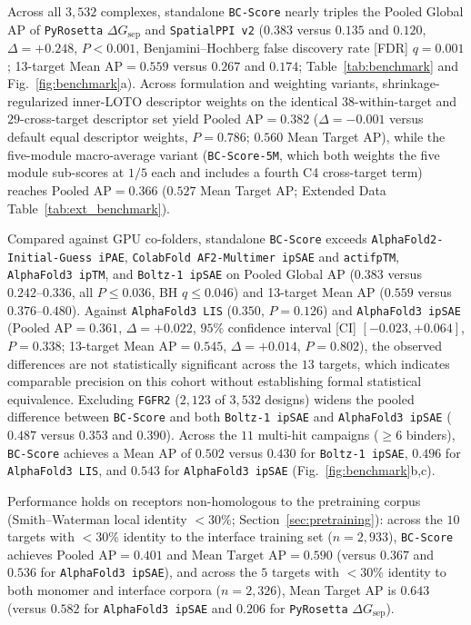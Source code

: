 \documentclass[10pt,twocolumn]{article}
\begin{document}
Across all $3,532$ complexes, standalone \texttt{BC-Score} nearly triples the Pooled Global AP of \texttt{PyRosetta} $\Delta G_{\text{sep}}$ and \texttt{SpatialPPI v2} ($0.383$ versus $0.135$ and $0.120$, $\Delta = +0.248$, $P < 0.001$, Benjamini--Hochberg false discovery rate [FDR] $q = 0.001$; 13-target Mean $\text{AP} = 0.559$ versus $0.267$ and $0.174$; Table~\ref{tab:benchmark} and Fig.~\ref{fig:benchmark}a). Across formulation and weighting variants, shrinkage-regularized inner-LOTO descriptor weights on the identical $38$-within-target and $29$-cross-target descriptor set yield $\text{Pooled AP} = 0.382$ ($\Delta = -0.001$ versus default equal descriptor weights, $P = 0.786$; $0.560$ Mean Target AP), while the five-module macro-average variant (\texttt{BC-Score-5M}, which both weights the five module sub-scores at $1/5$ each and includes a fourth C4 cross-target term) reaches $\text{Pooled AP} = 0.366$ ($0.527$ Mean Target AP; Extended Data Table~\ref{tab:ext_benchmark}).

Compared against GPU co-folders, standalone \texttt{BC-Score} exceeds \texttt{AlphaFold2-Initial-Guess iPAE}, \texttt{ColabFold AF2-Multimer ipSAE} and \texttt{actifpTM}, \texttt{AlphaFold3 ipTM}, and \texttt{Boltz-1 ipSAE} on Pooled Global AP ($0.383$ versus $0.242\text{--}0.336$, all $P \le 0.036$, BH $q \le 0.046$) and 13-target Mean AP ($0.559$ versus $0.376\text{--}0.480$). Against \texttt{AlphaFold3 LIS} ($0.350$, $P = 0.126$) and \texttt{AlphaFold3 ipSAE} ($\text{Pooled AP} = 0.361$, $\Delta = +0.022$, $95\%$ confidence interval [CI] $[-0.023, +0.064]$, $P = 0.338$; 13-target Mean $\text{AP} = 0.545$, $\Delta = +0.014$, $P = 0.802$), the observed differences are not statistically significant across the $13$ targets, which indicates comparable precision on this cohort without establishing formal statistical equivalence. Excluding \texttt{FGFR2} ($2,123$ of $3,532$ designs) widens the pooled difference between \texttt{BC-Score} and both \texttt{Boltz-1 ipSAE} and \texttt{AlphaFold3 ipSAE} ($0.487$ versus $0.353$ and $0.390$). Across the $11$ multi-hit campaigns ($\ge 6$ binders), \texttt{BC-Score} achieves a Mean AP of $0.502$ versus $0.430$ for \texttt{Boltz-1 ipSAE}, $0.496$ for \texttt{AlphaFold3 LIS}, and $0.543$ for \texttt{AlphaFold3 ipSAE} (Fig.~\ref{fig:benchmark}b,c).

Performance holds on receptors non-homologous to the pretraining corpus (Smith--Waterman local identity $<30\%$; Section~\ref{sec:pretraining}): across the $10$ targets with $<30\%$ identity to the interface training set ($n=2,933$), \texttt{BC-Score} achieves $\text{Pooled AP} = 0.401$ and $\text{Mean Target AP} = 0.590$ (versus $0.367$ and $0.536$ for \texttt{AlphaFold3 ipSAE}), and across the $5$ targets with $<30\%$ identity to both monomer and interface corpora ($n=2,326$), Mean Target AP is $0.643$ (versus $0.582$ for \texttt{AlphaFold3 ipSAE} and $0.206$ for \texttt{PyRosetta} $\Delta G_{\text{sep}}$).
\end{document}
